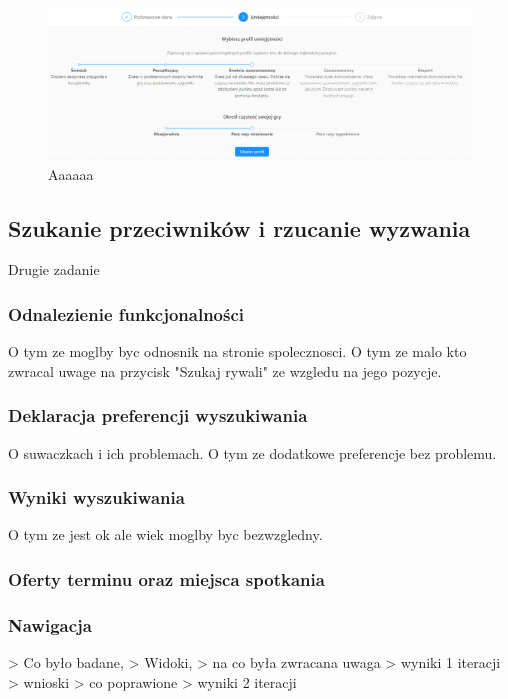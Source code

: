  
\begin{figure}[H]
\centering
\includegraphics[width=\linewidth]{07-walidacja/rys/p_skill.PNG}
\caption{Aaaaaa}
\label{fig:view-player-skill}
\end{figure}

\subsection{Szukanie przeciwników i rzucanie wyzwania}

Drugie zadanie 

\subsubsection{Odnalezienie funkcjonalności}

O tym ze moglby byc odnosnik na stronie spolecznosci. O tym ze malo kto zwracal uwage na przycisk "Szukaj rywali" ze wzgledu na jego pozycje.

\subsubsection{Deklaracja preferencji wyszukiwania}

O suwaczkach i ich problemach. O tym ze dodatkowe preferencje bez problemu.

\subsubsection{Wyniki wyszukiwania}

O tym ze jest ok ale wiek moglby byc bezwzgledny.

\subsubsection{Oferty terminu oraz miejsca spotkania}


\subsubsection{Nawigacja}


> Co było badane,
> Widoki,
> na co była zwracana uwaga
> wyniki 1 iteracji
> wnioski
> co poprawione
> wyniki 2 iteracji

